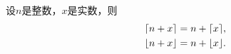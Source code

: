 \begin{proposition}
设\(n\)是整数，\(x\)是实数，则\begin{gather}
	\lceil n+x\rceil = n + \lceil x\rceil,
	\label{equation:取整函数.取整函数的周期性1} \\
	\lfloor n+x\rfloor = n + \lfloor x\rfloor.
	\label{equation:取整函数.取整函数的周期性2}
\end{gather}
\end{proposition}

